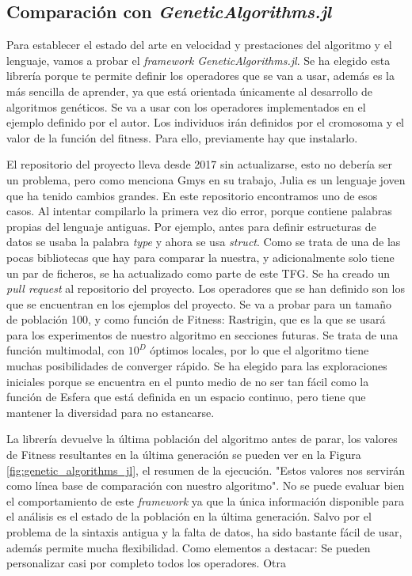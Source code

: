 \subsection{Comparación con \emph{GeneticAlgorithms.jl}}

Para establecer el estado del arte en velocidad y prestaciones del algoritmo y el lenguaje, vamos a probar
el \emph{framework} \emph{GeneticAlgorithms.jl}. Se ha elegido esta librería porque te permite definir los operadores que se van a usar, además es la más sencilla de aprender,
ya que está orientada únicamente al desarrollo de algoritmos genéticos. Se va a usar con los operadores implementados en el ejemplo definido por el autor. Los individuos 
irán definidos por el cromosoma y el valor de la función del fitness. Para ello, previamente hay que instalarlo.

El repositorio del proyecto lleva desde 2017 sin actualizarse, esto no debería ser un problema, pero como menciona Gmys \cite{comparative_study}
en su trabajo, Julia es un lenguaje joven que ha tenido cambios grandes. En este repositorio encontramos uno de esos casos. Al intentar compilarlo la primera vez dio error, porque contiene
palabras propias del lenguaje antiguas. Por ejemplo, antes para definir estructuras de datos se usaba la palabra \emph{type} y ahora se usa \emph{struct}. Como se trata de una de las pocas 
bibliotecas que hay para comparar la nuestra, y adicionalmente solo tiene un par de ficheros, se ha actualizado como parte de este TFG. Se ha creado un \emph{pull request} al repositorio del proyecto. 
Los operadores que se han definido son los que se encuentran en los ejemplos del proyecto. Se va a probar para un tamaño de población 100, y como función de Fitness: Rastrigin, 
que es la que se usará para los experimentos de nuestro algoritmo en secciones futuras. Se trata de una función multimodal, con $10^{D}$ óptimos locales, por lo que el algoritmo 
tiene muchas posibilidades de converger rápido. Se ha elegido para las exploraciones iniciales porque se encuentra en el punto medio de no ser tan fácil como la función de Esfera 
que está definida en un espacio continuo, pero tiene que mantener la diversidad para
no estancarse.

La librería devuelve la última población del algoritmo antes de parar, los valores de Fitness resultantes en la última generación se pueden ver en la Figura \ref{fig:genetic_algorithms_jl},
el resumen de la ejecución. "Estos valores nos servirán como línea base de comparación con nuestro algoritmo". No se puede evaluar bien el comportamiento de este \emph{framework} ya que 
la única información disponible para el análisis es el estado de la población en la última generación. Salvo por el problema de la sintaxis antigua y la falta de datos,
ha sido bastante fácil de usar, además permite mucha flexibilidad. Como elementos a destacar: Se pueden personalizar casi por completo todos los operadores. Otra

